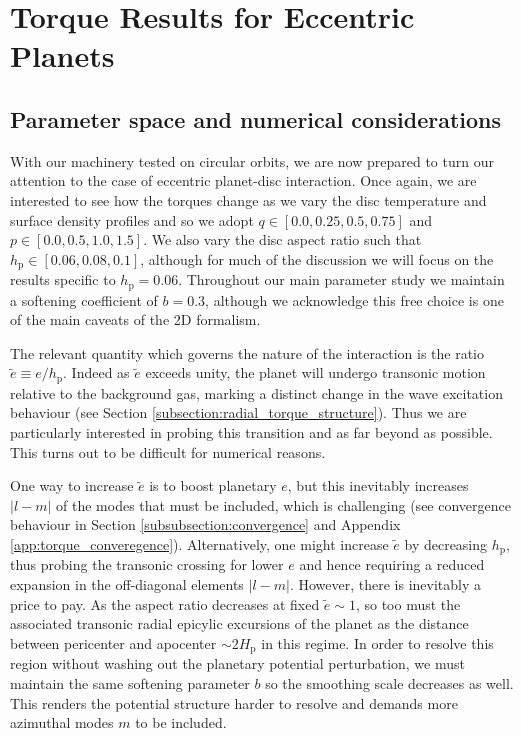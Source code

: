 \section{Torque Results for Eccentric Planets}
\label{sec:eccentric_torques}

\subsection{Parameter space and numerical considerations}
\label{subsection:eccentric_parameter_space}

With our machinery tested on circular orbits, we are now prepared to turn our attention to the case of eccentric planet-disc interaction. Once again, we are interested to see how the torques change as we vary the disc temperature and surface density profiles and so we adopt $q \in [0.0,0.25,0.5,0.75]$ and $p \in [0.0,0.5,1.0,1.5]$. We also vary the disc aspect ratio such that $h_\textrm{p} \in [0.06,0.08,0.1]$, although for much of the discussion we will focus on the results specific to $h_\textrm{p} = 0.06$. Throughout our main parameter study we maintain a softening coefficient of $b=0.3$, although we acknowledge this free choice is one of the main caveats of the 2D formalism.

The relevant quantity which governs the nature of the interaction is the ratio $\tilde{e} \equiv e/h_\textrm{p}$. Indeed as $\tilde{e}$ exceeds unity, the planet will undergo transonic motion relative to the background gas, marking a distinct change in the wave excitation behaviour (see Section \ref{subsection:radial_torque_structure}). Thus we are particularly interested in probing this transition and as far beyond as possible. This turns out to be difficult for numerical reasons. 

One way to increase $\tilde e$ is to boost planetary $e$, but this inevitably increases $|l-m|$ of the modes that must be included, which is challenging (see convergence behaviour in Section \ref{subsubsection:convergence} and Appendix \ref{app:torque_converegence}). Alternatively, one might increase $\tilde e$ by decreasing $h_\textrm{p}$, thus probing the transonic crossing for lower $e$ and hence requiring a reduced expansion in the off-diagonal elements $|l-m|$. However, there is inevitably a price to pay. As the aspect ratio decreases at fixed $\tilde e\sim 1$, so too must the associated transonic radial epicylic excursions of the planet as the distance between pericenter and apocenter $\sim 2H_\textrm{p}$ in this regime. In order to resolve this region without washing out the planetary potential perturbation, we must maintain the same softening parameter $b$ so the smoothing scale decreases as well. This renders the potential structure harder to resolve and demands more azimuthal modes $m$ to be included. 

